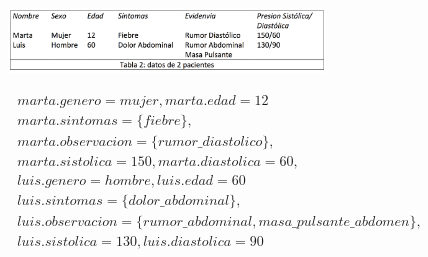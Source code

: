 \documentclass[10pt, a4paper,spanish]{article}
\begin{document}
			\begin{figure}[H]
				\begin{center}
					\includegraphics[width=0.75\textwidth]{table-2}
				\end{center}
			\end{figure}

			\begin{equation*}
				\begin{split}
					marta.genero=mujer, marta.edad=12 \\
					marta.sintomas=\{fiebre\}, \\
					marta.observacion=\{rumor\_diastolico\}, \\
					marta.sistolica=150, marta.diastolica=60,\\
					luis.genero=hombre, luis.edad=60 \\
					luis.sintomas=\{dolor\_abdominal\}, \\
					luis.observacion=\{rumor\_abdominal, masa\_pulsante\_abdomen\}, \\
					luis.sistolica=130, luis.diastolica=90\\
				\end{split}
			\end{equation*}
\end{document}
